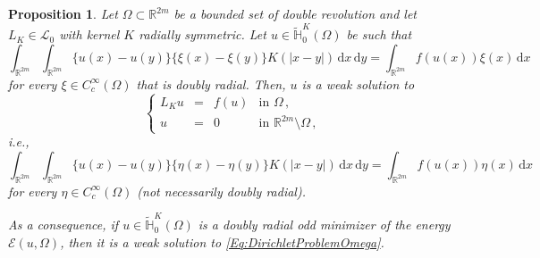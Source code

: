 \documentclass[12pt,reqno]{amsart}
\newtheorem{proposition}[theorem]{Proposition}
\theoremstyle{definition}
\theoremstyle{remark}
\newcommand{\con}[1]{\mathbb{#1}}
\newcommand{\R}{\con{R}} %
\renewcommand{\H}{\con{H}}
\newcommand{\ecal}{\mathcal{E}}
\newcommand{\lcal}{\mathcal{L}}
\renewcommand{\d}{\,\mathrm{d}} %
\newcommand\beqc[1]{\left\{\begin{array}{#1}}
\newcommand\eeqc{\end{array} \right.}
\def\PDEsystem{rcll}
\numberwithin{equation}{section}
\begin{document}
\begin{proposition}
	\label{Prop:WeakSolutionForAllTestFunctions}
	Let $\Omega \subset \R^{2m}$ be a bounded set of double revolution and let $L_K \in \lcal_0$ with kernel $K$ radially symmetric. Let $u\in \widetilde{\H}^K_{0}(\Omega)$ be such that
	$$
	\int_{\R^{2m}}\int_{\R^{2m}} \{u(x)-u(y)\}\{\xi(x)-\xi(y)\} K(|x-y|) \d x \d y = \int_{\R^{2m}} f(u(x)) \xi(x) \d x
	$$
	for every $\xi \in C^\infty_c(\Omega)$ that is doubly radial. Then, $u$ is a weak solution to
	\begin{equation}
		\label{Eq:DirichletProblemOmega}
	\beqc{\PDEsystem}
	L_K u &=& f(u) & \text{in } \Omega\,,\\
	u &=& 0 & \text{in } \R^{2m}\setminus \Omega\,,
	\eeqc
	\end{equation}
	i.e.,
	$$
	\int_{\R^{2m}}\int_{\R^{2m}} \{u(x)-u(y)\}\{\eta(x)-\eta(y)\} K(|x-y|) \d x \d y = \int_{\R^{2m}} f(u(x)) \eta(x) \d x
	$$
	for every $\eta \in C^\infty_c(\Omega)$ (not necessarily doubly radial).
	
	As a consequence, if $u\in \widetilde{\H}^K_{0}(\Omega)$ is a doubly radial odd minimizer of the energy $\ecal(u,\Omega)$, then it is a weak solution to \eqref{Eq:DirichletProblemOmega}.
\end{proposition}
\end{document}
